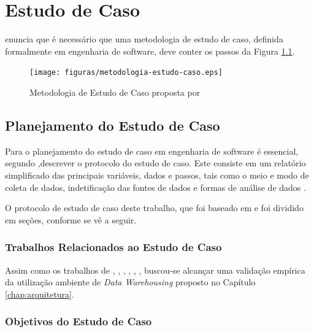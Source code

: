 \chapter{Estudo de Caso}
\label{estudo de caso}


 enuncia que é necessário que uma metodologia de estudo de caso, definida formalmente em engenharia de software, deve conter os passos da Figura \ref{fig:metodologia-estudo}.

\begin{figure}[ht!]
\centering
\texttt{[image: figuras/metodologia-estudo-caso.eps]}
\caption{Metodologia de Estudo de Caso proposta por }
\label{fig:metodologia-estudo}
\end{figure}
\FloatBarrier

\section{Planejamento do Estudo de Caso}
\label{sec:planning-case}
Para o planejamento do estudo de caso em engenharia de software é essencial, segundo ,descrever o protocolo do estudo de caso. Este consiste em um relatório simplificado das principais variáveis, dados e passos, tais como o meio e modo de coleta de dados, indetificação das fontes de dados e formas de análise de dados \cite{wohlin2012experimentation}. 


O protocolo de estudo de caso deste trabalho, que foi baseado em  e  foi dividido em seções, conforme se vê a seguir.


\subsection{Trabalhos Relacionados ao Estudo de Caso}

Assim como os trabalhos de , , , , , , buscou-se alcançar uma validação empírica da utilização ambiente de \textit{Data Warehousing} proposto no Capítulo \ref{chap:arquitetura}.


\subsection{Objetivos do Estudo de Caso}

